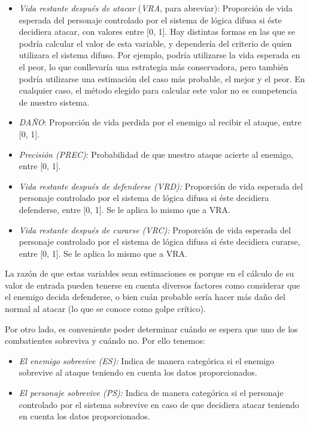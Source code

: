 \begin{itemize}
	\item \textit{Vida restante después de atacar} (\textit{VRA}, para abreviar): Proporción de vida esperada del personaje controlado por el sistema de lógica difusa si éste decidiera atacar, con valores entre [0, 1]. Hay distintas formas en las que se podría calcular el valor de esta variable, y dependería del criterio de quien utilizara el sistema difuso. Por ejemplo, podría utilizarse la vida esperada en el peor, lo que conllevaría una estrategia más conservadora, pero también podría utilizarse una estimación del caso más probable, el mejor y el peor. En cualquier caso, el método elegido para calcular este valor no es competencia de nuestro sistema.
	\item \textit{DAÑO}: Proporción de vida perdida por el enemigo al recibir el ataque, entre [0, 1]. 
	\item \textit{Precisión (PREC)}: Probabilidad de que nuestro ataque acierte al enemigo, entre [0, 1].
	\item \textit{Vida restante después de defenderse (VRD):} Proporción de vida esperada del personaje controlado por el sistema de lógica difusa si éste decidiera defenderse, entre [0, 1]. Se le aplica lo mismo que a VRA.
	\item \textit{Vida restante después de curarse (VRC):} Proporción de vida esperada del personaje controlado por el sistema de lógica difusa si éste decidiera curarse, entre [0, 1]. Se le aplica lo mismo que a VRA. 
\end{itemize}

La razón de que estas variables sean estimaciones es porque en el cálculo de su valor de entrada pueden tenerse en cuenta diversos factores como considerar que el enemigo decida defenderse, o bien cuán probable sería hacer más daño del normal al atacar (lo que se conoce como golpe crítico).

Por otro lado, es conveniente poder determinar cuándo se espera que uno de los combatientes sobreviva y cuándo no. Por ello tenemos:

\begin{itemize}
	\item \textit{El enemigo sobrevive (ES):} Indica de manera categórica si el enemigo sobrevive al ataque teniendo en cuenta los datos proporcionados.
	\item\textit{El personaje sobrevive (PS):} Indica de manera categórica si el personaje controlado por el sistema sobrevive en caso de que decidiera atacar teniendo en cuenta los datos proporcionados.
\end{itemize}

